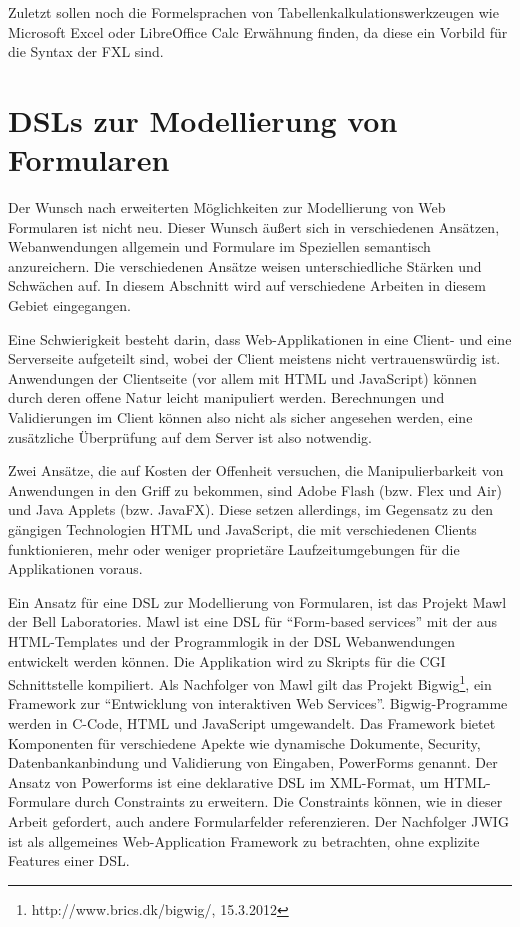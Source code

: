 Zuletzt sollen noch die Formelsprachen von Tabellenkalkulationswerkzeugen wie Microsoft Excel oder LibreOffice Calc Erwähnung finden, da diese ein Vorbild für die Syntax der FXL sind.


\section{DSLs zur Modellierung von Formularen}

Der Wunsch nach erweiterten Möglichkeiten zur Modellierung von Web Formularen ist nicht neu. Dieser Wunsch äußert sich in verschiedenen Ansätzen, Webanwendungen allgemein und Formulare im Speziellen semantisch anzureichern. Die verschiedenen Ansätze weisen unterschiedliche Stärken und Schwächen auf. In diesem Abschnitt wird auf verschiedene Arbeiten in diesem Gebiet eingegangen.

Eine Schwierigkeit besteht darin, dass Web-Applikationen in eine Client- und eine Serverseite aufgeteilt sind, wobei der Client meistens nicht vertrauenswürdig ist. Anwendungen der Clientseite (vor allem mit HTML und Java\-Script) können durch deren offene Natur leicht manipuliert werden. Berechnungen und Validierungen im Client können also nicht als sicher angesehen werden, eine zusätzliche Überprüfung auf dem Server ist also not\-wen\-dig. 

Zwei Ansätze, die auf Kosten der Offenheit versuchen, die Manipulierbarkeit von Anwendungen in den Griff zu bekommen, sind Adobe Flash (bzw. Flex und Air) und Java Applets (bzw. JavaFX). Diese setzen allerdings, im Gegensatz zu den gängigen Technologien HTML und Java\-Script, die mit verschiedenen Clients funktionieren, mehr oder weniger proprietäre Laufzeitumgebungen für die Applikationen voraus.

Ein Ansatz für eine DSL zur Modellierung von Formularen, ist das Projekt Mawl der Bell Laboratories\cite{AtBa99}. Mawl ist eine DSL für ``Form-based services'' mit der aus HTML-Templates und der Programmlogik in der DSL Web\-an\-wen\-dun\-gen entwickelt werden können. Die Applikation wird zu Skripts für die CGI Schnittstelle kompiliert. Als Nachfolger von Mawl gilt das Projekt Bigwig\footnote{http://www.brics.dk/bigwig/, 15.3.2012}, ein Framework zur ``Entwicklung von interaktiven Web Services''. Bigwig-Programme werden in C-Code, HTML und Java\-Script umgewandelt. Das Framework bietet Komponenten für verschiedene Apekte wie dynamische Dokumente, Security, Datenbankanbindung und Validierung von Eingaben, PowerForms genannt. Der Ansatz von Powerforms\cite{BrMo00} ist eine deklarative DSL im XML-Format, um HTML-Formulare durch Constraints zu erweitern. Die Constraints können, wie in dieser Arbeit gefordert, auch andere Formularfelder referenzieren. Der Nachfolger JWIG ist als allgemeines Web-Application Framework zu betrachten, ohne explizite Features einer DSL.


